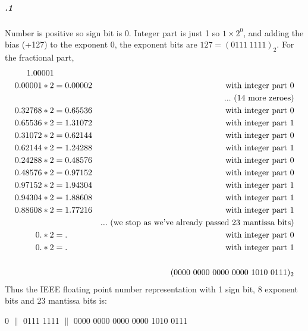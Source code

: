 \documentclass[11pt,letterpaper]{article}
\begin{document}
		\subparagraph{.1}
		Number is positive so sign bit is 0.
		Integer part is just 1 so $1 \times 2^0$, and adding the bias (+127) to the exponent 0, the exponent bits are $127 = (0111\ 1111)_{2}$.
		For the fractional part,
		\begin{align*}
		1.00001\\
		0.00001 * 2 &= 0.00002&\textnormal{with integer part 0}\\
		&&...\textnormal{ (14 more zeroes)}\\
		0.32768 * 2 &= 0.65536&\textnormal{with integer part 0}\\
		0.65536 * 2 &= 1.31072&\textnormal{with integer part 1}\\
		0.31072 * 2 &= 0.62144&\textnormal{with integer part 0}\\
		0.62144 * 2 &= 1.24288&\textnormal{with integer part 1}\\
		0.24288 * 2 &= 0.48576&\textnormal{with integer part 0}\\
		0.48576 * 2 &= 0.97152&\textnormal{with integer part 0}\\
		0.97152 * 2 &= 1.94304&\textnormal{with integer part 1}\\
		0.94304 * 2 &= 1.88608&\textnormal{with integer part 1}\\
		0.88608 * 2 &= 1.77216&\textnormal{with integer part 1}\\
		&&...\textnormal{ (we stop as we've already passed 23 mantissa bits)}\\
		0. * 2 &= .&\textnormal{with integer part 0}\\
		0. * 2 &= .&\textnormal{with integer part 1}\\
		\\
		&&(0000\ 0000\ 0000\ 0000\ 1010\ 0111)_2
		\end{align*}
		Thus the IEEE floating point number representation with 1 sign bit, 8 exponent bits and 23 mantissa bits is:
		\begin{center}
		0 $\|$ 0111 1111 $\|$ 0000 0000 0000 0000 1010 0111
		\end{center}
		
\end{document}
